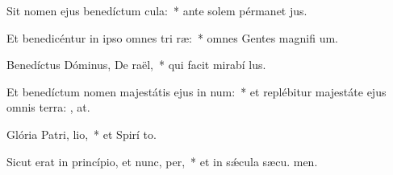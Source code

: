 \item Sit nomen ejus benedíctum  cula:~* ante solem pérmanet  jus.
\item Et benedicéntur in ipso omnes tri ræ:~* omnes Gentes magnifi um.
\item Benedíctus Dóminus, De raël,~* qui facit mirabí lus.
\item Et benedíctum nomen majestátis ejus in num:~* et replébitur majestáte ejus omnis terra: , at.
\item Glória Patri,  lio,~* et Spirí to.
\item Sicut erat in princípio, et nunc,  per,~* et in sǽcula sæcu. men.
